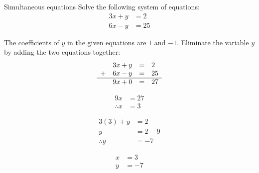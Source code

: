 \begin{wex}
{Simultaneous equations }
{Solve the following system of equations:
\begin{align*}
  3x+y &= 2 \\
  6x-y &= 25
\end{align*}
}
{
The coefficients of $y$ in the given equations are $1$ and $-1$. Eliminate the variable $y$ by adding the two equations together:
\begin{equation*}
\begin{array}{ccll}\hfill & 3x+y& =& 2\hfill \\ 
\hfill+ & 6x-y& =& 25\hfill \\ \hline
 \hfill & 9x + 0 &=& 27
\end{array}
\end{equation*}

\begin{align*}
  9x &= 27 \\
  \therefore x &= 3
\end{align*}

\begin{align*}
  3(3) + y &= 2 \\
  y &= 2-9 \\
  \therefore y &= -7 
\end{align*}


\begin{align*}
 x &= 3 \\
 y &= -7
\end{align*}
}
\end{wex}

